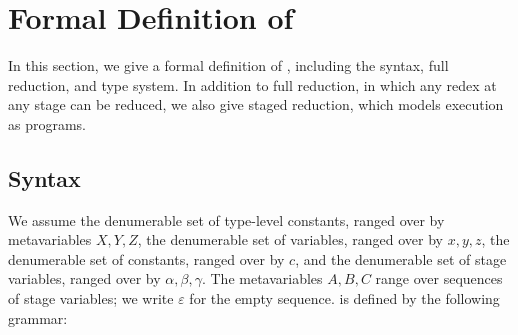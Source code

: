 
\section{Formal Definition of \LMD}

In this section, we give a formal definition of \LMD, including
the syntax, full reduction, and type system.  In addition to full reduction,
in which any redex at any stage can be reduced, we also give staged reduction,
which models execution as programs.

\subsection{Syntax}

We assume the denumerable set of type-level constants, ranged over by
metavariables \(X, Y, Z\), the denumerable set of variables, ranged
over by \(x,y,z\), the denumerable set of constants, ranged over by
\(c\), and the denumerable set of stage variables, ranged over by
\(\alpha, \beta, \gamma\).  The metavariables \(A, B, C\) range over
sequences of stage variables; we write \(\varepsilon\) for the empty
sequence.    \LMD is defined by the following grammar:


